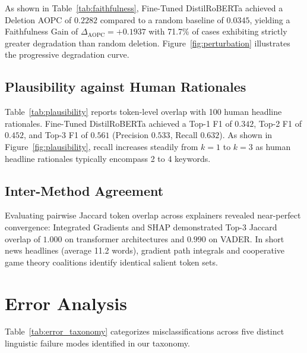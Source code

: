 \documentclass[10pt,twocolumn,letterpaper]{article}
\begin{document}
As shown in Table~\ref{tab:faithfulness}, Fine-Tuned DistilRoBERTa achieved a Deletion AOPC of $0.2282$ compared to a random baseline of $0.0345$, yielding a Faithfulness Gain of $\Delta_{\text{AOPC}} = +0.1937$ with 71.7\% of cases exhibiting strictly greater degradation than random deletion. Figure~\ref{fig:perturbation} illustrates the progressive degradation curve.



\subsection{Plausibility against Human Rationales}
Table~\ref{tab:plausibility} reports token-level overlap with 100 human headline rationales. Fine-Tuned DistilRoBERTa achieved a Top-1 F1 of $0.342$, Top-2 F1 of $0.452$, and Top-3 F1 of $0.561$ (Precision $0.533$, Recall $0.632$). As shown in Figure~\ref{fig:plausibility}, recall increases steadily from $k=1$ to $k=3$ as human headline rationales typically encompass 2 to 4 keywords.




\subsection{Inter-Method Agreement}
Evaluating pairwise Jaccard token overlap across explainers revealed near-perfect convergence: Integrated Gradients and SHAP demonstrated Top-3 Jaccard overlap of $1.000$ on transformer architectures and $0.990$ on VADER. In short news headlines (average 11.2 words), gradient path integrals and cooperative game theory coalitions identify identical salient token sets.

\section{Error Analysis}

Table~\ref{tab:error_taxonomy} categorizes misclassifications across five distinct linguistic failure modes identified in our taxonomy.


\end{document}
